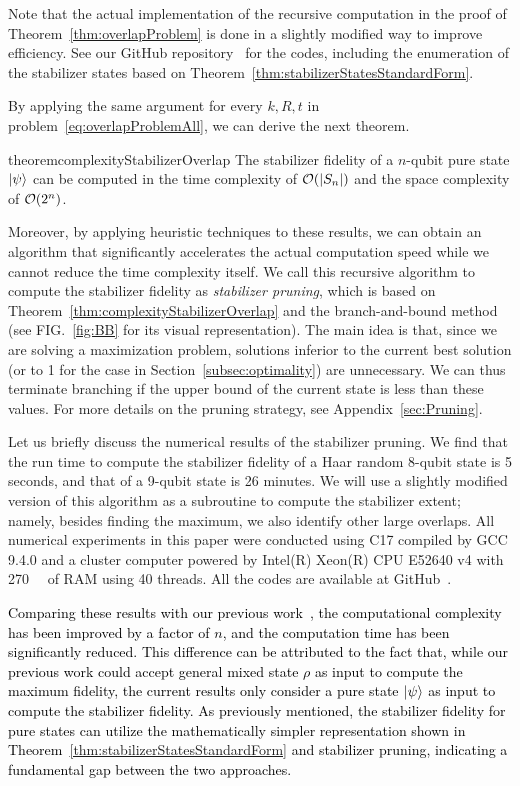 \documentclass[aps,prx,onecolumn,superscriptaddress,nobibnotes,nofootinbib]{revtex4-2}
\newcommand{\black}[1]{\textcolor{black}{#1}}
\newcommand{\Cpp}{C\nolinebreak[4]\hspace{-.05em}\raisebox{.4ex}{\relsize{-3}{\textbf{++}}}}
\begin{document}
Note that the actual implementation of the recursive computation in the proof of Theorem~\ref{thm:overlapProblem} is done in a slightly modified way to improve efficiency.
See our GitHub repository~\cite{Hamaguchi_stabilizer_extent_2024} for the codes, including the enumeration of the stabilizer states based on Theorem~\ref{thm:stabilizerStatesStandardForm}.

By applying the same argument for every $k,R,t$ in problem~\eqref{eq:overlapProblemAll},
we can derive the next theorem.
\begin{restatable}{theorem}{complexityStabilizerOverlap}
  \label{thm:complexityStabilizerOverlap}
  The stabilizer fidelity of a $n$-qubit pure state $\ket{\psi}$
  can be computed
  in the time complexity of
  $\order{\abs{S_n}}$ and
  the space complexity of $\order{2^n}$.
\end{restatable}

Moreover, by applying heuristic techniques to these results, we can obtain an algorithm that significantly accelerates the actual computation speed while we cannot reduce the time complexity itself.
We call this recursive algorithm to compute the stabilizer fidelity as \textit{stabilizer pruning}, which is based on Theorem~\ref{thm:complexityStabilizerOverlap} and the branch-and-bound method~\cite{Horst1990} (see FIG.~\ref{fig:BB} for its visual representation).
The main idea is that, since we are solving a maximization problem, solutions inferior to the current best solution (or to 1 for the case in Section~\ref{subsec:optimality}) are unnecessary. We can thus terminate branching if the upper bound of the current state is less than these values. For more details on the pruning strategy, see Appendix~\ref{sec:Pruning}.

Let us briefly discuss the numerical results of the stabilizer pruning.
We find that the run time to compute the stabilizer fidelity of a Haar random 8-qubit state is 5 seconds, and that of a 9-qubit state is 26 minutes.
We will use a slightly modified version of this algorithm as a subroutine to compute the stabilizer extent; namely, besides finding the maximum, we also identify other large overlaps.
All numerical experiments in this paper were conducted using \Cpp17
compiled by GCC 9.4.0 and a cluster computer powered by
Intel(R) Xeon(R) CPU E52640 v4 with \SI{270}{\giga\byte} of RAM using 40 threads.
All the codes are available at GitHub~\cite{Hamaguchi_stabilizer_extent_2024}.

\black{Comparing these results with our previous work~\cite[Corollary 1]{Hamaguchi2024handbookquantifying}, the computational complexity has been improved by a factor of $n$, and the computation time has been significantly reduced. This difference can be attributed to the fact that, while our previous work could accept general mixed state $\rho$ as input to compute the maximum fidelity, the current results only consider a pure state $\ket{\psi}$ as input to compute the stabilizer fidelity. As previously mentioned, the stabilizer fidelity for pure states can utilize the mathematically simpler representation shown in Theorem~\ref{thm:stabilizerStatesStandardForm} and stabilizer pruning, indicating a fundamental gap between the two approaches.}
\end{document}
